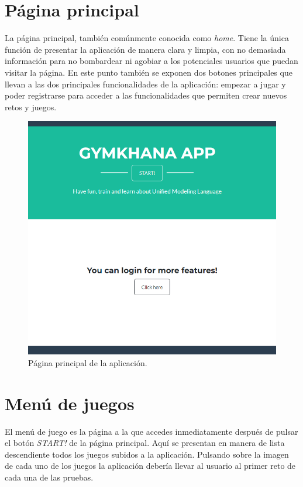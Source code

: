 \documentclass[a4paper, 12pt]{book}
\begin{document}
\section{Página principal}
La página principal, también comúnmente conocida como \emph{home}. Tiene la única función de presentar la aplicación de manera clara y limpia, con no demasiada información para no bombardear ni agobiar a los potenciales usuarios que puedan visitar la página. En este punto también se exponen dos botones principales que llevan a las dos principales funcionalidades de la aplicación: empezar a jugar y poder registrarse para acceder a las funcionalidades que permiten crear nuevos retos y juegos. 

\begin{figure}
	\centering
	\includegraphics[width=16cm, keepaspectratio]{img/home_html.png}
	\caption{Página principal de la aplicación.}\label{fig:home}
\end{figure}

\section{Menú de juegos}
El menú de juego es la página a la que accedes inmediatamente después de pulsar el botón \emph{START!} de la página principal. Aquí se presentan en manera de lista descendiente todos los juegos subidos a la aplicación. Pulsando sobre la imagen de cada uno de los juegos la aplicación debería llevar al usuario al primer reto de cada una de las pruebas. 
\end{document}
